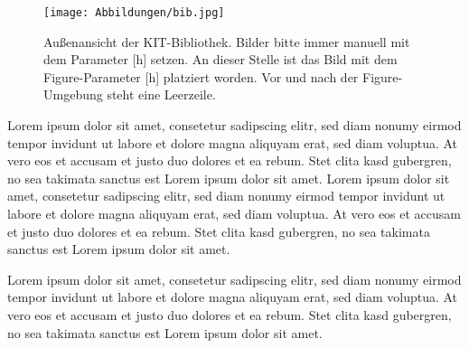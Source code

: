 \begin{figure}[h] %
	\centering
	\texttt{[image: Abbildungen/bib.jpg]}
	\caption{Außenansicht der KIT-Bibliothek. Bilder bitte immer manuell mit dem Parameter [h] setzen.	An dieser Stelle ist das Bild mit dem Figure-Parameter [h] platziert worden. Vor und nach der Figure-Umgebung steht eine Leerzeile.}
	\label{fig:bib}
\end{figure}

Lorem ipsum dolor sit amet, consetetur sadipscing elitr, sed diam nonumy eirmod tempor invidunt ut labore et dolore magna aliquyam erat, sed diam voluptua. At vero eos et accusam et justo duo dolores et ea rebum. Stet clita kasd gubergren, no sea takimata sanctus est Lorem ipsum dolor sit amet. Lorem ipsum dolor sit amet, consetetur sadipscing elitr, sed diam nonumy eirmod tempor invidunt ut labore et dolore magna aliquyam erat, sed diam voluptua. At vero eos et accusam et justo duo dolores et ea rebum. Stet clita kasd gubergren, no sea takimata sanctus est Lorem ipsum dolor sit amet.

Lorem ipsum dolor sit amet, consetetur sadipscing elitr, sed diam nonumy eirmod tempor invidunt ut labore et dolore magna aliquyam erat, sed diam voluptua. At vero eos et accusam et justo duo dolores et ea rebum. Stet clita kasd gubergren, no sea takimata sanctus est Lorem ipsum dolor sit amet. 	

